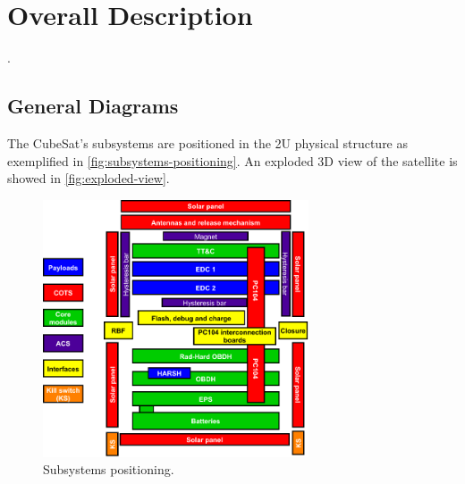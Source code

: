 %
%
%
%
%

%
%
%
%
%
%

\chapter{Overall Description} \label{ch:overall}

.

\section{General Diagrams}

The CubeSat's subsystems are positioned in the 2U physical structure as exemplified in \autoref{fig:subsystems-positioning}. An exploded 3D view of the satellite is showed in \autoref{fig:exploded-view}.

\begin{figure}[!ht]
    \begin{center}
        \includegraphics[width=0.7\textwidth]{figures/subsystems-positioning.pdf}
        \caption{Subsystems positioning.}
        \label{fig:subsystems-positioning}
    \end{center}
\end{figure}

